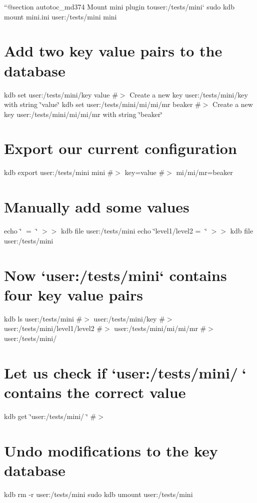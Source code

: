 ``{\ttfamily  @section autotoc\+\_\+md374 Mount mini plugin to}user\+:/tests/mini` sudo kdb mount mini.\+ini user\+:/tests/mini mini\hypertarget{autotoc_md371_autotoc_md375}{}\section{Add two key value pairs to the database}\label{autotoc_md371_autotoc_md375}
kdb set user\+:/tests/mini/key value \#$>$ Create a new key user\+:/tests/mini/key with string \char`\"{}value\char`\"{} kdb set user\+:/tests/mini/mi/mi/mr beaker \#$>$ Create a new key user\+:/tests/mini/mi/mi/mr with string \char`\"{}beaker\char`\"{}\hypertarget{autotoc_md371_autotoc_md376}{}\section{Export our current configuration}\label{autotoc_md371_autotoc_md376}
kdb export user\+:/tests/mini mini \#$>$ key=value \#$>$ mi/mi/mr=beaker\hypertarget{autotoc_md371_autotoc_md377}{}\section{Manually add some values}\label{autotoc_md371_autotoc_md377}
echo \char`\"{}🔑 = 🦄\char`\"{} $>$$>$ {\ttfamily kdb file user\+:/tests/mini} echo \char`\"{}level1/level2 = 👾\char`\"{} $>$$>$ {\ttfamily kdb file user\+:/tests/mini}\hypertarget{autotoc_md371_autotoc_md378}{}\section{Now `user\+:/tests/mini` contains four key value pairs}\label{autotoc_md371_autotoc_md378}
kdb ls user\+:/tests/mini \#$>$ user\+:/tests/mini/key \#$>$ user\+:/tests/mini/level1/level2 \#$>$ user\+:/tests/mini/mi/mi/mr \#$>$ user\+:/tests/mini/🔑\hypertarget{autotoc_md371_autotoc_md379}{}\section{Let us check if `user\+:/tests/mini/🔑` contains the correct value}\label{autotoc_md371_autotoc_md379}
kdb get \char`\"{}user\+:/tests/mini/🔑\char`\"{} \#$>$ 🦄\hypertarget{autotoc_md371_autotoc_md380}{}\section{Undo modifications to the key database}\label{autotoc_md371_autotoc_md380}
kdb rm -\/r user\+:/tests/mini sudo kdb umount user\+:/tests/mini 
